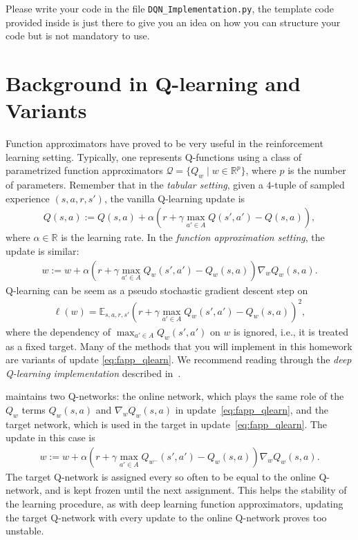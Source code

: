 \documentclass[12pt]{article}
\begin{document}
Please write your code in the file \texttt{DQN\_Implementation.py}, the template code provided inside is just there to give you an idea on how you can structure your code but is not mandatory to use.

\section*{Background in Q-learning and Variants}

Function approximators have proved to be very useful in the reinforcement learning setting. Typically, one represents Q-functions using a class of parametrized function approximators $\mathcal Q = \{ Q _w \mid w \in \mathbb R ^p \}$, where $p$ is the number of parameters. Remember that in the \emph{tabular setting}, given a $4$-tuple of sampled experience $(s, a, r, s')$, the vanilla Q-learning update is 
\begin{align}
	Q(s, a) := Q(s, a) + 
		\alpha \left( 
			r + \gamma \max _{a' \in A} Q(s', a') 
				- Q(s, a) 
		\right)   ,
	\label{eq:tab_qlearn}
\end{align}
where $\alpha \in \mathbb R$ is the learning rate. In the \emph{function approximation setting}, the update is similar: 
\begin{align}
	w := w + 
		\alpha \left( 
			r + \gamma \max _{a' \in A} Q _w(s', a') 
				- Q _w(s, a) 
		\right) \nabla _w 
			Q _w (s, a) .
	\label{eq:fapp_qlearn}
\end{align}
Q-learning can be seem as a 
pseudo stochastic gradient descent step on 
\begin{align*}
	\ell (w) = \mathbb E _{s, a, r, s'} 
		\left( 
			r + \gamma \max _{a' \in A} Q _w(s', a')
				- Q _w(s, a) 
		\right) ^2 ,
\end{align*}
where the dependency of $\max _{a' \in A} Q _w(s', a')$ on $w$ is ignored, i.e., it is treated as a fixed target. Many of the methods that you will implement in this homework are variants of update \eqref{eq:fapp_qlearn}. We recommend reading through the \emph{deep Q-learning implementation} described in~\cite{mnih2013playing, mnih2015human}. 

\iffalse 
maintains two Q-networks: the online network, which plays the same role of the $Q _w$ terms  $Q _w(s, a)$ and $\nabla _w Q _w (s, a)$ in update~\eqref{eq:fapp_qlearn}, and the target network, which is used in the target in update~\eqref{eq:fapp_qlearn}. The update in this case is 
\begin{align}
	w := w + 
		\alpha \left( 
			r + \gamma \max _{a' \in A} Q _{w ^-} (s', a') 
				- Q _w(s, a) 
		\right) \nabla _w 
			Q _w (s, a) .
\end{align}
The target Q-network is assigned every so often to be equal to the online Q-network, and is kept frozen until the next assignment. This helps the stability of the learning procedure, as with deep learning function approximators, updating the target Q-network with every update to the online Q-network proves too unstable. 
\end{document}
